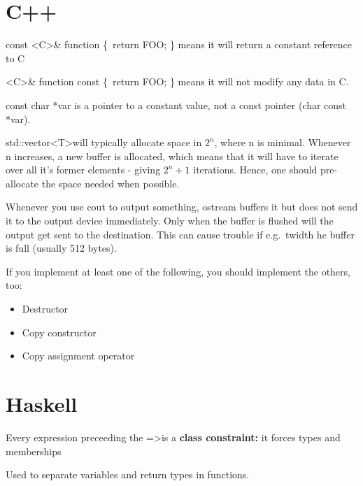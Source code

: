 \section{C++}

const \textless{C}\textgreater\& function \{\ return FOO; \}
means it will return a constant reference to C

\textless{C}\textgreater\& function const \{\ return FOO; \}
means it will not modify any data in C.

const char *var is a pointer to a constant value, not a const pointer
(char const *var).


std::vector\textless{T}\textgreater will typically allocate space in $2^{n}$, where n is minimal.
Whenever n increases, a new buffer is allocated, which means that it will
have to iterate over all it's former elements - giving ${2^n+1}$ iterations.
Hence, one should pre-allocate the space needed when possible.

Whenever you use cout to output something, ostream buffers it but does not send
it to the output device immediately. Only when the buffer is flushed will the
output get sent to the destination. This can cause trouble if e.g.\
twidth he buffer is full (usually 512 bytes).

\begin{definition}
    If you implement at least one of the following, you should implement
    the others, too:
    \begin{itemize}
        \item Destructor 
        \item Copy constructor 
        \item Copy assignment operator 
    \end{itemize}
\end{definition}

\section{Haskell}
\begin{definition}[=\textgreater]
    Every expression preceeding the =\textgreater is a 
    \textbf{class constraint:} it forces types and memberships

\end{definition}

\begin{definition}[-\textgreater]
    Used to separate variables and return types in functions.
\end{definition}


